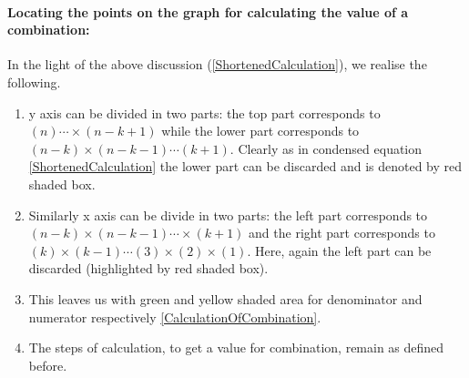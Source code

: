 \documentclass[10pt, twoside]{article}
\begin{document}
\paragraph{Locating the points on the graph for calculating the value of a combination:}In the light of the above discussion (\ref{ShortenedCalculation}), we realise the following. 
\begin{enumerate}
\item y axis can be divided in two parts: the top part corresponds to $(n)\cdots\times(n-k+1)$ while the lower part corresponds to $(n-k)\times(n-k-1)\cdots(k+1)$. Clearly as in condensed equation \ref{ShortenedCalculation} the lower part can be discarded and is denoted by red shaded box.
\item   Similarly x axis can be divide in two parts: the left part corresponds to $(n-k)\times(n-k-1)\cdots\times(k+1)$ and the right part corresponds to $(k)\times(k-1)\cdots(3)\times(2)\times(1)$. Here, again the left part can be discarded (highlighted by red shaded box). 
\item This leaves us with green and yellow shaded area for denominator and numerator respectively \ref{CalculationOfCombination}.
\item  The steps of calculation, to get a value for combination, remain as defined before.
\end{enumerate}
\end{document}
